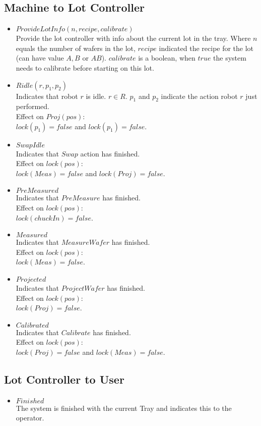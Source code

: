 \subsection{Machine to Lot Controller}
\begin{itemize}
\item $ProvideLotInfo(n, recipe, calibrate)$
\\Provide the lot controller with info about the current lot in the tray. Where $n$ equals the number of wafers in the lot, $recipe$ indicated the recipe for the lot (can have value $A, B$ or $AB$). $calibrate$ is a boolean, when $true$ the system needs to calibrate before starting on this lot.
\item $Ridle(r, p_1, p_2)$
\\Indicates that robot $r$ is idle. $r \in R$. $p_1$ and $p_2$ indicate the action robot $r$ just performed.\\
Effect on $Proj(pos)$:\\
$lock(p_1) = false$ and $lock(p_1) = false$.
\item $SwapIdle$
\\Indicates that $Swap$ action has finished.
\\Effect on $lock(pos)$:\\
$lock(Meas) = false$ and $lock(Proj) = false$.\\
\item $PreMeasured$
\\Indicates that $PreMeasure$ has finished.\\
Effect on $lock(pos)$:\\
$lock(chuckIn) = false$.\\
\item $Measured$
\\Indicates that $MeasureWafer$ has finished.\\
Effect on $lock(pos)$:\\
$lock(Meas) = false$.\\
\item $Projected$
\\Indicates that $ProjectWafer$ has finished.\\
Effect on $lock(pos)$:\\
$lock(Proj) = false$.\\
\item $Calibrated$
\\Indicates that $Calibrate$ has finished.\\
Effect on $lock(pos)$:\\
$lock(Proj) = false$ and $lock(Meas) = false$.\\
\end{itemize}

\subsection{Lot Controller to User}
\begin{itemize}
\item $Finished$
\\The system is finished with the current Tray and indicates this to the operator.
\end{itemize}
